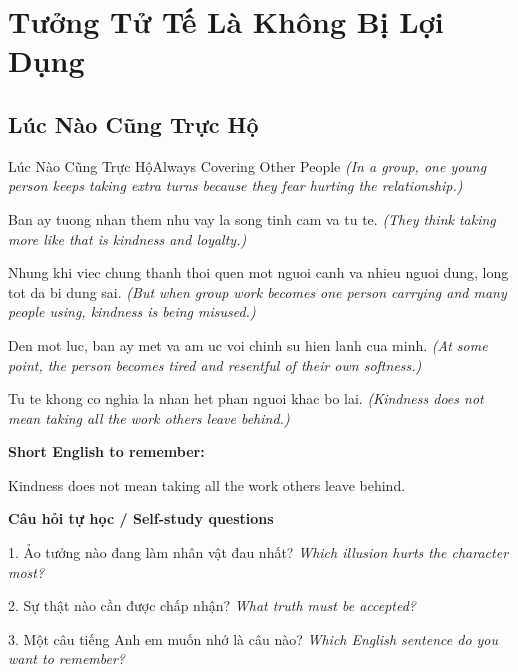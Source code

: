 \chapter{Tưởng Tử Tế Là Không Bị Lợi Dụng}

\section{Lúc Nào Cũng Trực Hộ}
\begin{truyen}{Lúc Nào Cũng Trực Hộ}{Always Covering Other People}
\textit{(In a group, one young person keeps taking extra turns because they fear hurting the relationship.)}

Ban ay tuong nhan them nhu vay la song tinh cam va tu te.
\textit{(They think taking more like that is kindness and loyalty.)}

Nhung khi viec chung thanh thoi quen mot nguoi canh va nhieu nguoi dung, long tot da bi dung sai.
\textit{(But when group work becomes one person carrying and many people using, kindness is being misused.)}

Den mot luc, ban ay met va am uc voi chinh su hien lanh cua minh.
\textit{(At some point, the person becomes tired and resentful of their own softness.)}

\end{truyen}

\begin{baihoc}
Tu te khong co nghia la nhan het phan nguoi khac bo lai.
\textit{(Kindness does not mean taking all the work others leave behind.)}
\end{baihoc}

\begin{ghinhoanh}
\textbf{Short English to remember:}

Kindness does not mean taking all the work others leave behind.

\end{ghinhoanh}

\begin{tuhocnhanh}
\textbf{Câu hỏi tự học / Self-study questions}

1. Ảo tưởng nào đang làm nhân vật đau nhất? \textit{Which illusion hurts the character most?}

2. Sự thật nào cần được chấp nhận? \textit{What truth must be accepted?}

3. Một câu tiếng Anh em muốn nhớ là câu nào? \textit{Which English sentence do you want to remember?}
\end{tuhocnhanh}
\ngancach

